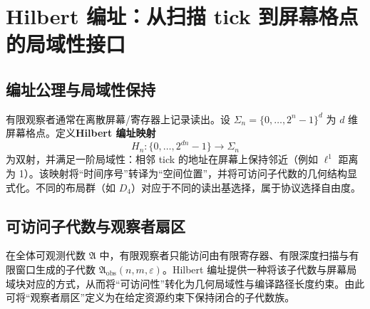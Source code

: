 \section{Hilbert 编址：从扫描 tick 到屏幕格点的局域性接口}

\subsection{编址公理与局域性保持}

有限观察者通常在离散屏幕/寄存器上记录读出。设 $\Sigma_n=\{0,\dots,2^n-1\}^d$ 为 $d$ 维屏幕格点。定义\textbf{Hilbert 编址映射}
\[
H_n:\{0,\dots,2^{dn}-1\}\to\Sigma_n
\]
为双射，并满足一阶局域性：相邻 tick 的地址在屏幕上保持邻近（例如 $\ell^1$ 距离为 1）。该映射将“时间序号”转译为“空间位置”，并将可访问子代数的几何结构显式化。不同的布局群（如 $D_4$）对应于不同的读出基选择，属于协议选择自由度。

\subsection{可访问子代数与观察者扇区}

在全体可观测代数 $\mathfrak{A}$ 中，有限观察者只能访问由有限寄存器、有限深度扫描与有限窗口生成的子代数 $\mathfrak{A}_{\mathrm{obs}}(n,m,\varepsilon)$。Hilbert 编址提供一种将该子代数与屏幕局域块对应的方式，从而将“可访问性”转化为几何局域性与编译路径长度约束。由此可将“观察者扇区”定义为在给定资源约束下保持闭合的子代数族。

